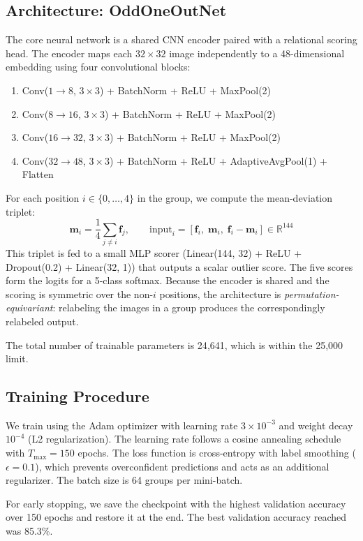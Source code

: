 \documentclass[11pt]{article}
\begin{document}
\subsection{Architecture: OddOneOutNet}

The core neural network is a shared CNN encoder paired with a relational scoring head. The encoder
maps each $32\times32$ image independently to a 48-dimensional embedding using four convolutional blocks:
\begin{enumerate}[noitemsep]
  \item Conv($1\to8$, $3\times3$) + BatchNorm + ReLU + MaxPool(2)
  \item Conv($8\to16$, $3\times3$) + BatchNorm + ReLU + MaxPool(2)
  \item Conv($16\to32$, $3\times3$) + BatchNorm + ReLU + MaxPool(2)
  \item Conv($32\to48$, $3\times3$) + BatchNorm + ReLU + AdaptiveAvgPool(1) + Flatten
\end{enumerate}

For each position $i \in \{0,\ldots,4\}$ in the group, we compute the mean-deviation triplet:
\[
  \mathbf{m}_i = \frac{1}{4}\sum_{j \neq i} \mathbf{f}_j, \qquad
  \text{input}_i = [\mathbf{f}_i,\; \mathbf{m}_i,\; \mathbf{f}_i - \mathbf{m}_i] \in \mathbb{R}^{144}
\]
This triplet is fed to a small MLP scorer (Linear(144, 32) + ReLU + Dropout(0.2) + Linear(32, 1))
that outputs a scalar outlier score. The five scores form the logits for a 5-class softmax. Because the
encoder is shared and the scoring is symmetric over the non-$i$ positions, the architecture is
\emph{permutation-equivariant}: relabeling the images in a group produces the correspondingly
relabeled output.

The total number of trainable parameters is 24{,}641, which is within the 25{,}000 limit.

\subsection{Training Procedure}

We train using the Adam optimizer with learning rate $3\times10^{-3}$ and weight decay $10^{-4}$ (L2
regularization). The learning rate follows a cosine annealing schedule with $T_{\max}=150$ epochs.
The loss function is cross-entropy with label smoothing ($\epsilon=0.1$), which prevents overconfident
predictions and acts as an additional regularizer. The batch size is 64 groups per mini-batch.

For early stopping, we save the checkpoint with the highest validation accuracy over 150 epochs and
restore it at the end. The best validation accuracy reached was 85.3\%.
\end{document}
